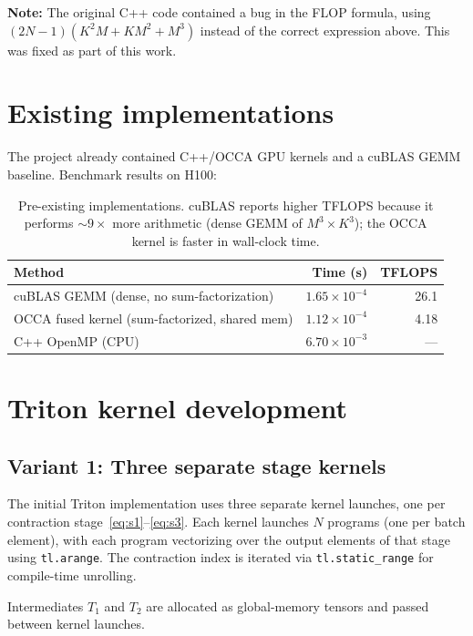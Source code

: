 \documentclass[11pt]{article}
\begin{document}
\textbf{Note:} The original C++ code contained a bug in the FLOP formula,
using $(2N-1)(K^2 M + K M^2 + M^3)$ instead of the correct expression above.
This was fixed as part of this work.

\section{Existing implementations}

The project already contained C++/OCCA GPU kernels and a cuBLAS GEMM
baseline.  Benchmark results on H100:

\begin{table}[H]
\centering
\begin{tabular}{lrr}
\toprule
\textbf{Method} & \textbf{Time (s)} & \textbf{TFLOPS} \\
\midrule
cuBLAS GEMM (dense, no sum-factorization) & $1.65 \times 10^{-4}$ & 26.1 \\
OCCA fused kernel (sum-factorized, shared mem) & $1.12 \times 10^{-4}$ & 4.18 \\
C++ OpenMP (CPU) & $6.70 \times 10^{-3}$ & --- \\
\bottomrule
\end{tabular}
\caption{Pre-existing implementations.  cuBLAS reports higher TFLOPS because
it performs $\sim\!9\times$ more arithmetic (dense GEMM of $M^3 \times K^3$);
the OCCA kernel is faster in wall-clock time.}
\label{tab:existing}
\end{table}

\section{Triton kernel development}

\subsection{Variant 1: Three separate stage kernels}

The initial Triton implementation uses three separate kernel launches,
one per contraction stage~\eqref{eq:s1}--\eqref{eq:s3}.  Each kernel
launches $N$ programs (one per batch element), with each program
vectorizing over the output elements of that stage using
\texttt{tl.arange}.  The contraction index is iterated via
\texttt{tl.static\_range} for compile-time unrolling.

Intermediates $T_1$ and $T_2$ are allocated as global-memory tensors
and passed between kernel launches.
\end{document}
